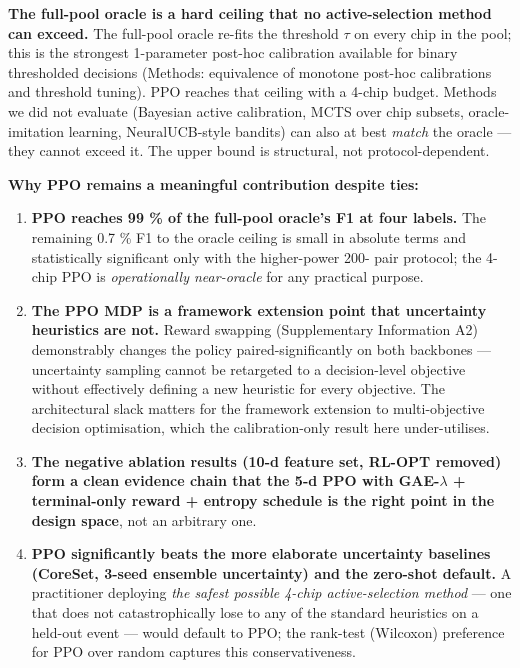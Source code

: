 \textbf{The full-pool oracle is a hard ceiling that no active-selection method
can exceed.} The full-pool oracle re-fits the threshold $\tau$ on every chip
in the pool; this is the strongest 1-parameter post-hoc calibration
available for binary thresholded decisions (Methods: equivalence of
monotone post-hoc calibrations and threshold tuning). PPO reaches that
ceiling with a 4-chip budget. Methods we did not evaluate (Bayesian
active calibration, MCTS over chip subsets, oracle-imitation learning,
NeuralUCB-style bandits) can also at best \emph{match} the oracle --- they
cannot exceed it. The upper bound is structural, not protocol-dependent.

\textbf{Why PPO remains a meaningful contribution despite ties:}

\begin{enumerate}
\def\labelenumi{\arabic{enumi}.}
\tightlist
\item
  \textbf{PPO reaches 99 \% of the full-pool oracle's F1 at four labels.}
  The remaining 0.7 \% F1 to the oracle ceiling is small in absolute
  terms and statistically significant only with the higher-power 200-
  pair protocol; the 4-chip PPO is \emph{operationally near-oracle} for
  any practical purpose.
\item
  \textbf{The PPO MDP is a framework extension point that uncertainty
  heuristics are not.} Reward swapping (Supplementary Information A2)
  demonstrably changes the policy paired-significantly on both
  backbones --- uncertainty sampling cannot be retargeted to a
  decision-level objective without effectively defining a new
  heuristic for every objective. The architectural slack matters for
  the framework extension to multi-objective decision optimisation,
  which the calibration-only result here under-utilises.
\item
  \textbf{The negative ablation results (10-d feature set, RL-OPT removed)
  form a clean evidence chain that the 5-d PPO with GAE-$\lambda$ +
  terminal-only reward + entropy schedule is the right point in the
  design space}, not an arbitrary one.
\item
  \textbf{PPO significantly beats the more elaborate uncertainty baselines
  (CoreSet, 3-seed ensemble uncertainty) and the zero-shot default.}
  A practitioner deploying \emph{the safest possible 4-chip
  active-selection method} --- one that does not catastrophically lose
  to any of the standard heuristics on a held-out event --- would
  default to PPO; the rank-test (Wilcoxon) preference for PPO over
  random captures this conservativeness.
\end{enumerate}

